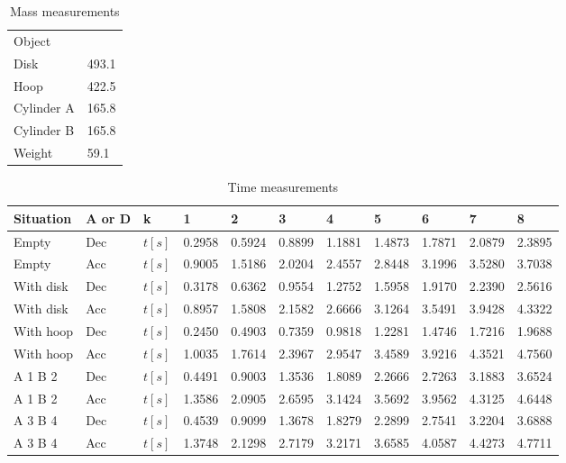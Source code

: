 \begin{table}[H]
  \centering
  \begin{tabular}{|l|l|}
    \hline
    Object & \\
    Disk & 493.1\\
    Hoop & 422.5\\
    Cylinder A & 165.8\\
    Cylinder B & 165.8\\
    Weight & 59.1 \\
    \hline
  \end{tabular}
  \caption{Mass measurements}
  \end{table}
\begin{table}[H]
  \centering
\begin{tabular}{|p{2cm}|p{1.5cm}|l|l|l|l|l|l|l|l|l|}
\hline
Situation & A or D & k & 1 & 2 & 3 & 4 & 5 & 6 & 7 & 8 \\
\hline
Empty & Dec & $t[s]$ & 0.2958 & 0.5924 & 0.8899 & 1.1881 & 1.4873 & 1.7871 & 2.0879 & 2.3895 \\
Empty & Acc & $t[s]$ & 0.9005 & 1.5186 & 2.0204 & 2.4557 & 2.8448 & 3.1996 & 3.5280 & 3.7038 \\
With disk & Dec &  $t[s]$ & 0.3178 & 0.6362 & 0.9554 & 1.2752 & 1.5958 & 1.9170 & 2.2390 & 2.5616 \\
With disk & Acc &  $t[s]$ & 0.8957 & 1.5808 & 2.1582 & 2.6666 & 3.1264 & 3.5491 & 3.9428 & 4.3322 \\
With hoop & Dec &  $t[s]$ & 0.2450 & 0.4903 & 0.7359 & 0.9818 & 1.2281 & 1.4746 & 1.7216 & 1.9688 \\
With hoop & Acc &  $t[s]$ & 1.0035 & 1.7614 & 2.3967 & 2.9547 & 3.4589 & 3.9216 & 4.3521 & 4.7560 \\
A 1 B 2 & Dec &  $t[s]$ & 0.4491 & 0.9003 & 1.3536 & 1.8089 & 2.2666 & 2.7263 & 3.1883 & 3.6524 \\
A 1 B 2 & Acc &  $t[s]$ & 1.3586 & 2.0905 & 2.6595 & 3.1424 & 3.5692 & 3.9562 & 4.3125 & 4.6448 \\
A 3 B 4 & Dec &  $t[s]$ & 0.4539 & 0.9099 & 1.3678 & 1.8279 & 2.2899 & 2.7541 & 3.2204 & 3.6888 \\
A 3 B 4 & Acc &  $t[s]$ & 1.3748 & 2.1298 & 2.7179 & 3.2171 & 3.6585 & 4.0587 & 4.4273 & 4.7711 \\
\hline
\end{tabular}
\caption{ Time measurements}
\end{table}
